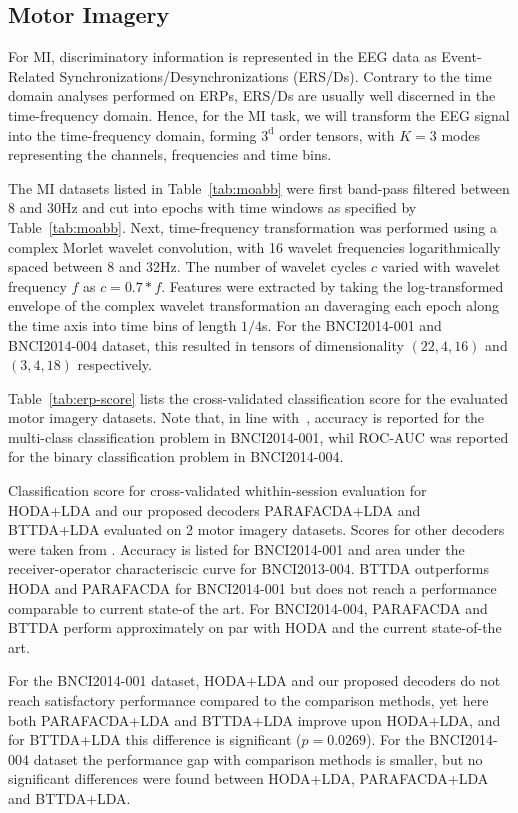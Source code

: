 \documentclass[twocolumn]{article}
\begin{document}
\subsection{Motor Imagery}
For MI, discriminatory information is represented in the EEG data as
Event-Related Synchronizations/Desynchronizations (ERS/Ds).
Contrary to the time domain analyses performed on ERPs, ERS/Ds are usually well
discerned in the time-frequency domain.
Hence, for the MI task, we will transform the EEG signal into the
time-frequency domain, forming $3^\text{d}$ order tensors, with $K=3$ modes
representing the channels, frequencies and time bins.

The MI datasets listed in Table~\ref{tab:moabb} were first band-pass filtered
between 8 and 30Hz and cut into
epochs with time windows as specified by Table~\ref{tab:moabb}.
Next, time-frequency transformation was performed using a complex Morlet wavelet
convolution, with 16 wavelet frequencies logarithmically spaced between 8 and
32Hz.
The number of wavelet cycles $c$ varied with wavelet frequency $f$ as
$c=0.7*f$.
Features were extracted by taking the log-transformed envelope of the complex
wavelet transformation an daveraging each epoch along the time axis into time bins of
length $1/4$s.
For the BNCI2014-001 and BNCI2014-004 dataset, this resulted in tensors of dimensionality
$(22, 4, 16)$ and  $(3, 4, 18)$
respectively.

Table~\ref{tab:erp-score} lists the cross-validated classification score for
the evaluated motor imagery datasets.
Note that, in line with~\cite{Chevallier2024}, accuracy is reported for the
multi-class classification problem in BNCI2014-001, whil ROC-AUC was reported for the
binary classification problem in BNCI2014-004.
\begin{table}[t]
  \centering
	\footnotesize
	
  \caption{Classification score for
		cross-validated whithin-session evaluation for HODA+LDA and our proposed decoders
		PARAFACDA+LDA and BTTDA+LDA evaluated on 2 motor imagery datasets.
		Scores for other decoders were taken from \cite{Chevallier2024}. Accuracy
    is listed for BNCI2014-001 and area under the receiver-operator
    characteriscic curve for BNCI2013-004. BTTDA outperforms HODA and PARAFACDA
    for BNCI2014-001 but does not reach a performance comparable to current
    state-of the art. For BNCI2014-004, PARAFACDA and BTTDA perform
    approximately on par with HODA and the current state-of-the art.}
	\label{tab:mi-score}
\end{table}
For the BNCI2014-001 dataset, HODA+LDA and our proposed decoders do not reach
satisfactory performance compared to the comparison methods, yet here both
PARAFACDA+LDA and BTTDA+LDA improve upon HODA+LDA, and for BTTDA+LDA this
difference is significant ($p=0.0269$).
For the BNCI2014-004 dataset the performance gap with comparison methods is
smaller, but no significant differences were found between HODA+LDA,
PARAFACDA+LDA and BTTDA+LDA.
\end{document}

